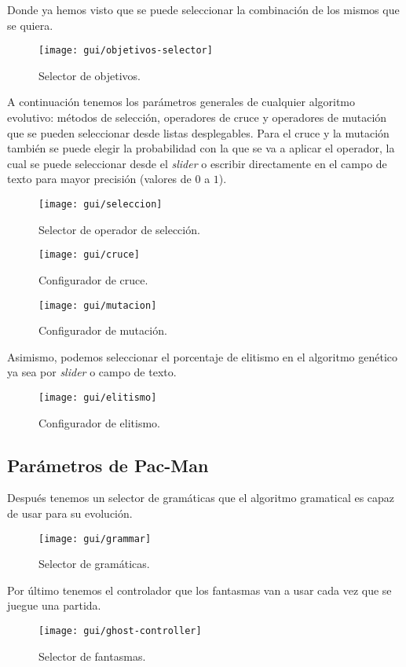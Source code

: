Donde ya hemos visto que se puede seleccionar la combinación de los mismos que se quiera.
\begin{figure}[H]
\centering
\texttt{[image: gui/objetivos-selector]}
\caption{Selector de objetivos.}
\end{figure}

A continuación tenemos los parámetros generales de cualquier algoritmo evolutivo: métodos de selección, operadores de cruce y operadores de mutación que se pueden seleccionar desde listas desplegables. Para el cruce y la mutación también se puede elegir la probabilidad con la que se va a aplicar el operador, la cual se puede seleccionar desde el \textit{slider} o escribir directamente en el campo de texto para mayor precisión (valores de $0$ a $1$).
\begin{figure}[H]
\centering
\texttt{[image: gui/seleccion]}
\caption{Selector de operador de selección.}
\end{figure}
\begin{figure}[H]
\centering
\texttt{[image: gui/cruce]}
\caption{Configurador de cruce.}
\end{figure}
\begin{figure}[H]
\centering
\texttt{[image: gui/mutacion]}
\caption{Configurador de mutación.}
\end{figure}

Asimismo, podemos seleccionar el porcentaje de elitismo en el algoritmo genético ya sea por \textit{slider} o campo de texto.
\begin{figure}[H]
\centering
\texttt{[image: gui/elitismo]}
\caption{Configurador de elitismo.}
\end{figure}

\subsection{Parámetros de Pac-Man}
Después tenemos un selector de gramáticas que el algoritmo gramatical es capaz de usar para su evolución.
\begin{figure}[H]
\centering
\texttt{[image: gui/grammar]}
\caption{Selector de gramáticas.}
\end{figure}

Por último tenemos el controlador que los fantasmas van a usar cada vez que se juegue una partida.
\begin{figure}[H]
\centering
\texttt{[image: gui/ghost-controller]}
\caption{Selector de fantasmas.}
\end{figure}

